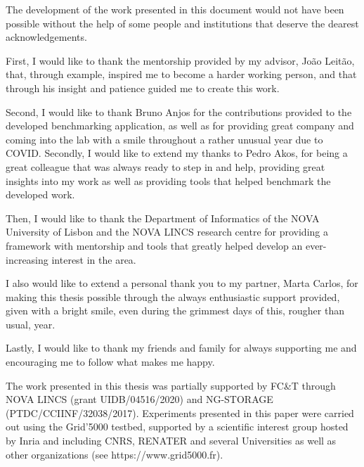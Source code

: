 

\begin{ntacknowledgements}


The development of the work presented in this document would not have been possible without the help of some people and institutions that deserve the dearest acknowledgements.

First, I would like to thank the mentorship provided by my advisor, João Leitão, that, through example, inspired me to become a harder working person, and that through his insight and patience guided me to create this work.

Second, I would like to thank Bruno Anjos for the contributions provided to the developed benchmarking application, as well as for providing great company and coming into the lab with a smile throughout a rather unusual year due to COVID. Secondly, I would like to extend my thanks to Pedro Akos, for being a great colleague that was always ready to step in and help, providing great insights into my work as well as providing tools that helped benchmark the developed work.

Then, I would like to thank the Department of Informatics of the NOVA University of Lisbon and the NOVA LINCS research centre for providing a framework with mentorship and tools that greatly helped develop an ever-increasing interest in the area.

I also would like to extend a personal thank you to my partner, Marta Carlos, for making this thesis possible through the always enthusiastic support provided, given with a bright smile, even during the grimmest days of this, rougher than usual, year.

Lastly, I would like to thank my friends and family for always supporting me and encouraging me to follow what makes me happy.


The work presented in this thesis was partially supported by FC&T through NOVA LINCS (grant UIDB/04516/2020) and NG-STORAGE (PTDC/CCIINF/32038/2017). Experiments presented in this paper were carried out using the Grid’5000 testbed, supported by a scientific interest group hosted by Inria and including CNRS, RENATER and several Universities as well as other organizations (see https://www.grid5000.fr).



\end{ntacknowledgements}